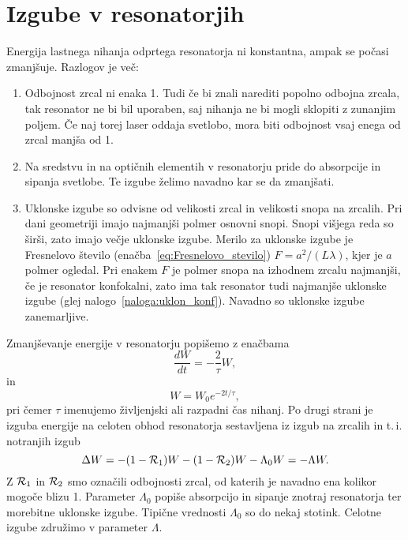 \section{Izgube v resonatorjih}
Energija lastnega nihanja odprtega resonatorja ni konstantna, ampak se počasi
zmanjšuje. Razlogov je več:
\begin{enumerate}
\item Odbojnost zrcal ni enaka 1. Tudi če bi znali narediti popolno odbojna zrcala, 
tak resonator ne bi bil uporaben, saj nihanja ne bi mogli sklopiti z zunanjim poljem. Če 
naj torej laser oddaja svetlobo, mora biti odbojnost vsaj enega od zrcal manjša od 1.\\
\item Na sredstvu in na optičnih elementih v resonatorju pride do absorpcije in
sipanja svetlobe. Te izgube želimo navadno kar se da zmanjšati.\\
\item Uklonske izgube so odvisne od velikosti zrcal in velikosti snopa na zrcalih.
Pri dani geometriji imajo najmanjši polmer osnovni snopi. Snopi višjega
reda so širši, zato imajo večje uklonske izgube. Merilo za uklonske
izgube je Fresnelovo število (enačba~\ref{eq:Fresnelovo_stevilo}) 
$F=a^{2}/(L\lambda)$, kjer je $a$ polmer ogledal. Pri enakem $F$ je
polmer snopa na izhodnem zrcalu najmanjši, če je resonator konfokalni, 
zato ima tak resonator tudi najmanjše uklonske izgube (glej nalogo~\ref{naloga:uklon_konf}).
Navadno so uklonske izgube zanemarljive. 
\end{enumerate}

Zmanjševanje energije v resonatorju popišemo z enačbama 
\begin{equation}
\frac{dW}{dt}=-\frac{2}{\tau}W,
\label{eq:dW}
\end{equation}
in 
\begin{equation}
W = W_0 e^{-2t/\tau},
\label{eq:dW1}
\end{equation}
pri čemer $\tau$ imenujemo življenjski ali razpadni čas nihanj.
Po drugi strani je izguba energije na celoten obhod resonatorja 
sestavljena iz izgub na zrcalih in t.\,i.\, notranjih izgub
\begin{equation}
\Delta W = -(1-{\cal R}_{1})W-(1-{\cal R}_{2})W -\Lambda_{0} W = -\Lambda W.
\label{eq:Lambda}
\end{equation}
Z ${\cal R}_{1}$ in ${\cal R}_{2}$ smo označili odbojnosti zrcal, od katerih je navadno ena
kolikor mogoče blizu 1. Parameter $\Lambda_{0}$ popiše absorpcijo in
sipanje znotraj resonatorja ter morebitne uklonske izgube. Tipične vrednosti 
$\Lambda_0$ so do nekaj stotink. Celotne izgube združimo v parameter $\Lambda$. 

